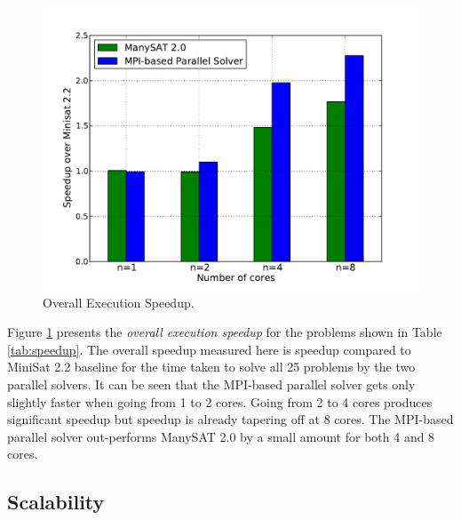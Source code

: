 \documentclass[letterpaper, compsoc, conference]{IEEEtran}
\begin{document}
\begin{figure}[htbp]
    \begin{center}
        \includegraphics[width=\columnwidth]{images/speedup1.pdf}
        \caption{Overall Execution Speedup.}
        \label{fig:speedup}
    \end{center}
\end{figure}

Figure \ref{fig:speedup} presents the \emph{overall execution speedup} for the
problems shown in Table \ref{tab:speedup}. The overall speedup measured here is
speedup compared to MiniSat 2.2 baseline for the time taken to solve all 25
problems by the two parallel solvers. It can be seen that the MPI-based
parallel solver gets only slightly faster when going from 1 to 2 cores. Going
from 2 to 4 cores produces significant speedup but speedup is already tapering
off at 8 cores. The MPI-based parallel solver out-performs ManySAT 2.0 by a
small amount for both 4 and 8 cores.

\subsection{Scalability}
\label{sec:scalability}
\end{document}
